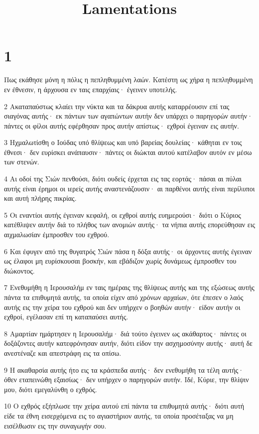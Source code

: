 

\title{Lamentations}


\chapter{1}

\par Πως εκάθησε μόνη η πόλις η πεπληθυμμένη λαών. Κατέστη ως χήρα η πεπληθυμμένη εν έθνεσιν, η άρχουσα εν ταις επαρχίαις· έγεινεν υποτελής.
\par 2 Ακαταπαύστως κλαίει την νύκτα και τα δάκρυα αυτής καταρρέουσιν επί τας σιαγόνας αυτής· εκ πάντων των αγαπώντων αυτήν δεν υπάρχει ο παρηγορών αυτήν· πάντες οι φίλοι αυτής εφέρθησαν προς αυτήν απίστως· εχθροί έγειναν εις αυτήν.
\par 3 Ηχμαλωτίσθη ο Ιούδας υπό θλίψεως και υπό βαρείας δουλείας· κάθηται εν τοις έθνεσι· δεν ευρίσκει ανάπαυσιν· πάντες οι διώκται αυτού κατέλαβον αυτόν εν μέσω των στενών.
\par 4 Αι οδοί της Σιών πενθούσι, διότι ουδείς έρχεται εις τας εορτάς· πάσαι αι πύλαι αυτής είναι έρημοι οι ιερείς αυτής αναστενάζουσιν· αι παρθένοι αυτής είναι περίλυποι και αυτή πλήρης πικρίας.
\par 5 Οι εναντίοι αυτής έγειναν κεφαλή, οι εχθροί αυτής ευημερούσι· διότι ο Κύριος κατέθλιψεν αυτήν διά το πλήθος των ανομιών αυτής· τα νήπια αυτής επορεύθησαν εις αιχμαλωσίαν έμπροσθεν του εχθρού.
\par 6 Και έφυγεν από της θυγατρός Σιών πάσα η δόξα αυτής· οι άρχοντες αυτής έγειναν ως έλαφοι μη ευρίσκουσαι βοσκήν, και εβάδιζον χωρίς δυνάμεως έμπροσθεν του διώκοντος.
\par 7 Ενεθυμήθη η Ιερουσαλήμ εν ταις ημέραις της θλίψεως αυτής και της εξώσεως αυτής πάντα τα επιθυμητά αυτής, τα οποία είχεν από χρόνων αρχαίων, ότε έπεσεν ο λαός αυτής εις την χείρα του εχθρού και δεν υπήρχεν ο βοηθών αυτήν· είδον αυτήν οι εχθροί, εγέλασαν επί τη καταπαύσει αυτής.
\par 8 Αμαρτίαν ημάρτησεν η Ιερουσαλήμ· διά τούτο έγεινεν ως ακάθαρτος· πάντες οι δοξάζοντες αυτήν κατεφρόνησαν αυτήν, διότι είδον την ασχημοσύνην αυτής· αυτή δε ανεστέναζε και απεστράφη εις τα οπίσω.
\par 9 Η ακαθαρσία αυτής ήτο εις τα κράσπεδα αυτής· δεν ενεθυμήθη τα τέλη αυτής· όθεν εταπεινώθη εξαισίως· δεν υπήρχεν ο παρηγορών αυτήν. Ιδέ, Κύριε, την θλίψιν μου, διότι εμεγαλύνθη ο εχθρός.
\par 10 Ο εχθρός εξήπλωσε την χείρα αυτού επί πάντα τα επιθυμητά αυτής· διότι αυτή είδε τα έθνη εισερχόμενα εις το αγιαστήριον αυτής, τα οποία προσέταξας να μη εισέλθωσιν εις την συναγωγήν σου.
